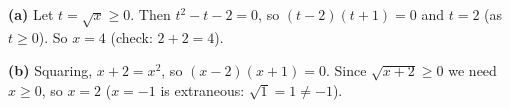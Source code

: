 \textbf{(a)} Let $t=\sqrt x\ge0$. Then $t^2-t-2=0$, so $(t-2)(t+1)=0$ and $t=2$ (as $t\ge0$). So $x=\boxed{4}$ (check: $2+2=4$).

\textbf{(b)} Squaring, $x+2=x^2$, so $(x-2)(x+1)=0$. Since $\sqrt{x+2}\ge0$ we need $x\ge0$, so $x=\boxed{2}$ ($x=-1$ is extraneous: $\sqrt1=1\ne-1$).
